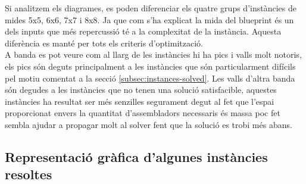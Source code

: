 Si analitzem els diagrames, es poden diferenciar els quatre grups d'instàncies de mides 5x5, 6x6, 7x7 i 8x8. Ja que com s'ha explicat la mida del blueprint és un dels inputs que més repercussió té a la complexitat de la instància. Aquesta diferència es manté per tots els criteris d'optimització.\\
A banda es pot veure com al llarg de les instàncies hi ha pics i valls molt notoris, els pics són deguts principalment a les instàncies que són particularment difícils pel motiu comentat a la secció \ref{subsec:instances-solved}. Les valls d'altra banda són degudes a les instàncies que no tenen una solució satisfacible, aquestes instàncies ha resultat ser més senzilles segurament degut al fet que l'espai proporcionat envers la quantitat d'assembladors necessaris és massa poc fet sembla ajudar a propagar molt al solver fent que la solució es trobi més abans.\\




\subsection{Representació gràfica d'algunes instàncies resoltes}



